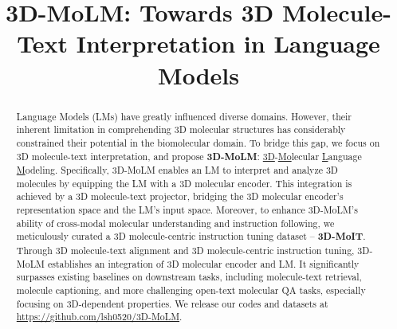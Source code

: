 \title{3D-MoLM: Towards 3D Molecule-Text Interpretation in Language Models}



\maketitle

\vspace{-10pt}

\vspace{-2mm}
\begin{abstract}
    \vspace{-2mm}
    Language Models (LMs) have greatly influenced diverse domains. However, their inherent limitation in comprehending 3D molecular structures has considerably constrained their potential in the biomolecular domain. To bridge this gap, we focus on 3D molecule-text interpretation, and propose \textbf{3D-MoLM}: \underline{3D}-\underline{Mo}lecular \underline{L}anguage \underline{M}odeling. Specifically, 3D-MoLM enables an LM to interpret and analyze 3D molecules by equipping the LM with a 3D molecular encoder. This integration is achieved by a 3D molecule-text projector, bridging the 3D molecular encoder's representation space and the LM's input space. Moreover, to enhance 3D-MoLM's ability of cross-modal molecular understanding and instruction following, we meticulously curated a 3D molecule-centric instruction tuning dataset -- \textbf{3D-MoIT}. Through 3D molecule-text alignment and 3D molecule-centric instruction tuning, 3D-MoLM establishes an integration of 3D molecular encoder and LM. It significantly surpasses existing baselines on downstream tasks, including molecule-text retrieval, molecule captioning, and more challenging open-text molecular QA tasks, especially focusing on 3D-dependent properties. 
    We release our codes and datasets at \url{https://github.com/lsh0520/3D-MoLM}.
\end{abstract}
\vspace{-3mm}

\vspace{-1mm}
